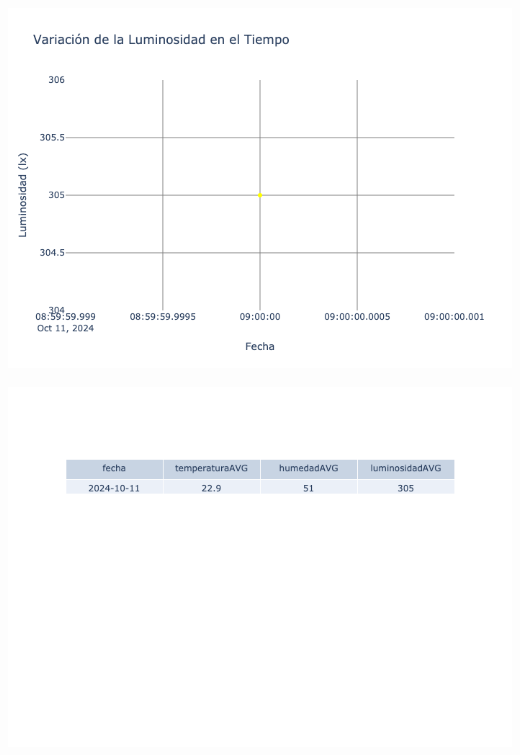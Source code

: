 \documentclass{article}
\begin{document}
    \noindent
    \begin{minipage}{0.48\textwidth}
        \centering
        \includegraphics[width=\textwidth]{../img/poli/LS403-90Dias-03-12-2024.png}
    \end{minipage}
    \hfill
    \begin{minipage}{0.48\textwidth}
        \centering
        \includegraphics[width=\textwidth]{../img/tables/CAVG403-90Dias-03-12-2024.png}
    \end{minipage}
    
\end{document}
